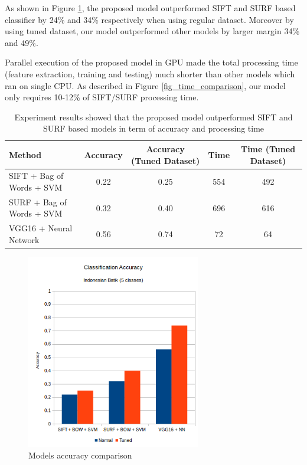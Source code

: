 \documentclass[conference]{IEEEtran}
\begin{document}
As shown in Figure \ref{fig_accuracy_comparison}, the proposed model outperformed SIFT and SURF based classifier by 24\% and 34\% respectively when using regular dataset. Moreover by using tuned dataset, our model outperformed other models by larger margin 34\% and 49\%.

Parallel execution of the proposed model in GPU made the total processing time (feature extraction, training and testing) much shorter than other models which ran on single CPU. As described in Figure \ref{fig_time_comparison}, our model only requires 10-12\% of SIFT/SURF processing time.

\begin{table}
\centering
\renewcommand{\arraystretch}{1.5}
\begin{tabular}{|p{5cm}|c|c|c|c|}
\rowcolor{Gray}
\hline \centering \textbf{Method} & \textbf{Accuracy} & \textbf{Accuracy (Tuned Dataset)}  & \textbf{Time} & \textbf{Time (Tuned Dataset)} \\ 
\hline SIFT + Bag of Words + SVM  & 0.22 & 0.25 & 554  & 492 \\ 
\hline SURF + Bag of Words + SVM  & 0.32 & 0.40 & 696 & 616 \\ 
\hline VGG16 + Neural Network & 0.56 & 0.74 & 72 & 64 \\ 
\hline 
\end{tabular}
\caption{Experiment results showed that the proposed model outperformed SIFT and SURF based models in term of accuracy and processing time}
\label{tab_experiment_results}
\end{table}

\begin{figure}
\centering
\includegraphics[width=3.0in]{chart_accuracy}
\caption{Models accuracy comparison}
\label{fig_accuracy_comparison}
\end{figure}
\end{document}
